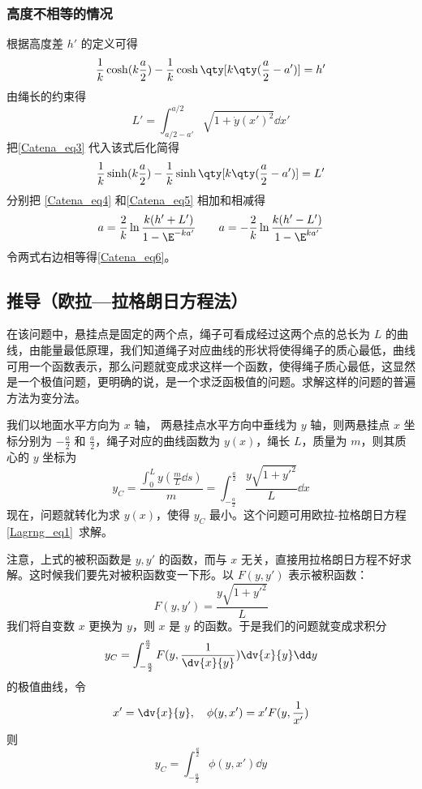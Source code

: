 \subsubsection{高度不相等的情况}
根据高度差 $h'$ 的定义可得
\begin{equation}\label{Catena_eq4}
\frac{1}{k}\cosh(k\frac{a}{2}) - \frac{1}{k}\cosh\qty[k\qty(\frac{a}{2}-a')] = h'
\end{equation}
由绳长的约束得
\begin{equation}
L' = \int_{a/2-a'}^{a/2} \sqrt{1 + \dot y(x')^2} \dd{x'}
\end{equation}
把\autoref{Catena_eq3} 代入该式后化简得
\begin{equation}\label{Catena_eq5}
\frac{1}{k}\sinh(k\frac{a}{2}) - \frac{1}{k}\sinh\qty[k\qty(\frac{a}{2}-a')] = L'
\end{equation}
分别把 \autoref{Catena_eq4} 和\autoref{Catena_eq5} 相加和相减得
\begin{equation}
a = \frac{2}{k} \ln\frac{k(h'+L')}{1 - \E^{-ka'}}
\qquad
a = -\frac{2}{k} \ln\frac{k(h'-L')}{1 - \E^{ka'}}
\end{equation}
令两式右边相等得\autoref{Catena_eq6}。

\subsection{推导（欧拉—拉格朗日方程法）}
在该问题中，悬挂点是固定的两个点，绳子可看成经过这两个点的总长为 $L$ 的曲线，由能量最低原理，我们知道绳子对应曲线的形状将使得绳子的质心最低，曲线可用一个函数表示，那么问题就变成求这样一个函数，使得绳子质心最低，这显然是一个极值问题，更明确的说，是一个求泛函极值的问题。求解这样的问题的普遍方法为变分法。

我们以地面水平方向为 $x$ 轴， 两悬挂点水平方向中垂线为 $y$ 轴，则两悬挂点 $x$ 坐标分别为 $-\frac{a}{2}$ 和 $\frac{a}{2}$，绳子对应的曲线函数为 $y(x)$，绳长 $L$，质量为 $m$，则其质心的 $y$ 坐标为
\begin{equation}
y_C=\frac{\int_{0}^{L}y(\frac{m}{L}\dd s)}{m}=\int_{-\frac{a}{2}}^{\frac{a}{2}} \frac{y\sqrt{1+y'^2}}{L}\dd x
\end{equation}
现在，问题就转化为求 $y(x)$，使得 $y_C$ 最小。这个问题可用欧拉-拉格朗日方程\autoref{Lagrng_eq1}~求解。

注意，上式的被积函数是 $y,y'$ 的函数，而与 $x$ 无关，直接用拉格朗日方程不好求解。这时候我们要先对被积函数变一下形。以 $F(y,y')$ 表示被积函数： 
\begin{equation}\label{Catena_eq05}
F(y,y')=\frac{y\sqrt{1+y'^2}}{L}
\end{equation}
我们将自变数 $x$ 更换为 $y$，则 $x$ 是 $y$ 的函数。于是我们的问题就变成求积分
\begin{equation}
y_C=\int_{-\frac{a}{2}}^{\frac{a}{2}} F(y,\frac{1}{\dv {x}{y} })\dv{x}{y}\dd y
\end{equation}
的极值曲线，令 
\begin{equation}\label{Catena_eq9}
x'=\dv{x}{y},\quad \phi(y,x')=x'F(y,\frac{1}{x'})
\end{equation}
则
\begin{equation}
y_C=\int_{-\frac{a}{2}}^{\frac{a}{2}} \phi(y,x')\dd y
\end{equation}

